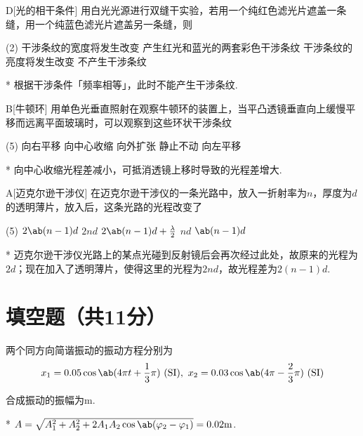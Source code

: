 \begin{choice}{D}[光的相干条件]
    用白光光源进行双缝干实验，若用一个纯红色滤光片遮盖一条缝，用一个纯蓝色滤光片遮盖另一条缝，则
    \begin{tasks}(2)
        \task 干涉条纹的宽度将发生改变
        \task 产生红光和蓝光的两套彩色干涉条纹
        \task 干涉条纹的亮度将发生改变
        \task 不产生干涉条纹
    \end{tasks}
\end{choice}
\begin{solution}*
    根据干涉条件「频率相等」，此时不能产生干涉条纹.
\end{solution}

\begin{choice}{B}[牛顿环]
    用单色光垂直照射在观察牛顿环的装置上，当平凸透镜垂直向上缓慢平移而远离平面玻璃时，可以观察到这些环状干涉条纹
    \begin{tasks}(5)
        \task 向右平移
        \task 向中心收缩
        \task 向外扩张
        \task 静止不动
        \task 向左平移
    \end{tasks}
\end{choice}
\begin{solution}*
    向中心收缩光程差减小，可抵消透镜上移时导致的光程差增大.
\end{solution}

\begin{choice}{A}[迈克尔逊干涉仪]
    在迈克尔逊干涉仪的一条光路中，放入一折射率为$n$，厚度为$d$的透明薄片，放入后，这条光路的光程改变了
    \begin{tasks}(5)
        \task $2\ab(n-1)d$
        \task $2nd$
        \task $2\ab(n-1)d+\frac{\lambda}{2}$
        \task $nd$
        \task $\ab(n-1)d$
    \end{tasks}
\end{choice}
\begin{solution}*
    迈克尔逊干涉仪光路上的某点光碰到反射镜后会再次经过此处，故原来的光程为$2d$；现在加入了透明薄片，使得这里的光程为$2nd$，故光程差为$2(n-1)d$.
\end{solution}

\section{填空题（共11分）}
\begin{problem}[简谐振动的合成][3]
    两个同方向简谐振动的振动方程分别为
    \[x_1=0.05\cos\ab(4\pi t+\frac{1}{3}\pi)\ (\mathrm{SI}),\ x_2=0.03\cos\ab(4\pi-\frac{2}{3}\pi)\ (\mathrm{SI})\]

    合成振动的振幅为$\mathrm{m}$.
\end{problem}
\begin{solution}*
    $A=\sqrt{A_1^2+A_2^2+2A_1A_2\cos{\ab(\varphi_2-\varphi_1)}}=0.02\mathrm{m}$.
\end{solution}

